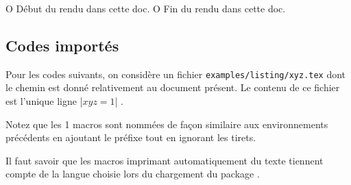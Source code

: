 

\usepackage[lang = french]{../main/main}
\usepackage{../macroenv/macroenv}
\usepackage{../inenglish/inenglish}
\usepackage{../showcase/showcase}
\usepackage{../rem-exa/rem-exa}

\usepackage{listing}





                       { O{ Début du rendu dans cette doc. }
                         O{ Fin du rendu dans cette doc. } }{
    \begin{colorstrip}{green!5}
        \smallskip
}{
        \smallskip
        \bdocextraruler{#2}
    \end{colorstrip}
}





\subsection{Codes importés}

Pour les codes suivants, on considère un fichier \verb+examples/listing/xyz.tex+ dont le chemin est donné relativement au document présent.
Le contenu de ce fichier est l'unique ligne \bdocinlatex|$x y z = 1$| .

\medskip

Notez que les 1\ieres{} macros sont nommées de façon similaire aux environnements précédents en ajoutant le préfixe  tout en ignorant les tirets.


\begin{bdocrem}
    Il faut savoir que les macros imprimant automatiquement du texte tiennent compte de la langue choisie lors du chargement du package .
\end{bdocrem}


